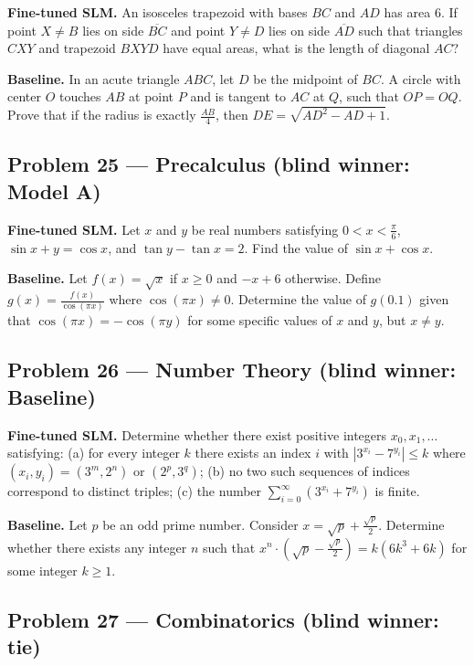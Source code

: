 \documentclass[11pt]{article}
\begin{document}
\textbf{Fine-tuned SLM.} An isosceles trapezoid with bases $BC$ and $AD$ has area 6. If point $X \neq B$ lies on side $\overline{BC}$ and point $Y \neq D$ lies on side $\overline{AD}$ such that triangles $CXY$ and trapezoid $BXYD$ have equal areas, what is the length of diagonal $AC$?

\medskip

\textbf{Baseline.} In an acute triangle $ABC$, let $D$ be the midpoint of $BC$. A circle with center $O$ touches $AB$ at point $P$ and is tangent to $AC$ at $Q$, such that $OP = OQ$. Prove that if the radius is exactly $\frac{AB}{4}$, then $DE = \sqrt{AD^2 - AD + 1}$.

\subsection*{Problem 25 --- Precalculus \quad (blind winner: Model A)}

\textbf{Fine-tuned SLM.} Let $x$ and $y$ be real numbers satisfying $0<x<\frac{\pi}{6}$, $\sin x+y=\cos x$, and $\tan y-\tan x=2$. Find the value of $\sin x+\cos x$.

\medskip

\textbf{Baseline.} Let $f(x) = \sqrt{x}$ if $x \geq 0$ and $-x+6$ otherwise. Define $g(x) = \frac{f(x)}{\cos(\pi x)}$ where $\cos(\pi x) \neq 0$. Determine the value of $g(0.1)$ given that $\cos(\pi x) = -\cos(\pi y)$ for some specific values of $x$ and $y$, but $x \neq y$.

\subsection*{Problem 26 --- Number Theory \quad (blind winner: Baseline)}

\textbf{Fine-tuned SLM.} Determine whether there exist positive integers $x_{0}, x_{1}, \ldots$ satisfying: (a) for every integer $k$ there exists an index $i$ with $|3^{x_{i}}-7^{y_{i}}| \leq k$ where $(x_{i}, y_{i})=(3^{m}, 2^{n})$ or $(2^{p}, 3^{q})$; (b) no two such sequences of indices correspond to distinct triples; (c) the number $\sum_{i=0}^{\infty}(3^{x_{i}}+7^{y_{i}})$ is finite.

\medskip

\textbf{Baseline.} Let $p$ be an odd prime number. Consider $x = \sqrt{p} + \frac{\sqrt{p}}{2}$. Determine whether there exists any integer $n$ such that $x^n \cdot (\sqrt{p} - \frac{\sqrt{p}}{2}) = k(6k^3 + 6k)$ for some integer $k \geq 1$.

\subsection*{Problem 27 --- Combinatorics \quad (blind winner: tie)}
\end{document}
